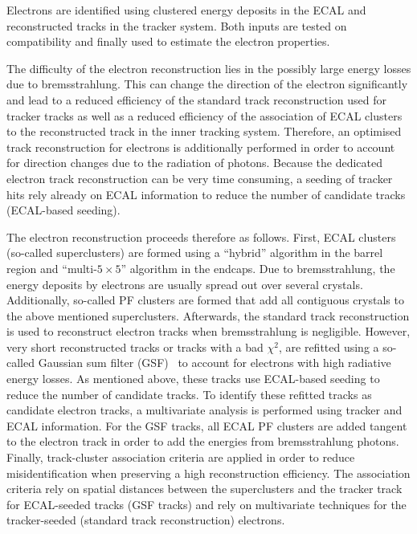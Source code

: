 Electrons are identified using clustered energy deposits in the ECAL and reconstructed tracks in the tracker system. 
Both inputs are tested on compatibility and finally used to estimate the electron properties. 

The difficulty of the electron reconstruction lies in the possibly large energy losses due to bremsstrahlung.
This can change the direction of the electron significantly and lead to a reduced efficiency of the standard track reconstruction used for tracker tracks as well as a reduced efficiency of the association of ECAL clusters to the reconstructed track in the inner tracking system.
Therefore, an optimised track reconstruction for electrons is additionally performed in order to account for direction changes due to the radiation of photons.
Because the dedicated electron track reconstruction can be very time consuming, a seeding of tracker hits rely already on ECAL information to reduce the number of candidate tracks (ECAL-based seeding).

The electron reconstruction proceeds therefore as follows.
First, ECAL clusters (so-called superclusters) are formed using a ``hybrid'' algorithm in the barrel region and ``multi-$5\times 5$'' algorithm in the endcaps.
Due to bremsstrahlung, the energy deposits by electrons are usually spread out over several crystals.
Additionally, so-called PF clusters are formed that add all contiguous crystals to the above mentioned superclusters. 
Afterwards, the standard track reconstruction is used to reconstruct electron tracks when bremsstrahlung is negligible.
However, very short reconstructed tracks or tracks with a bad $\chi^2$, are refitted using a so-called Gaussian sum filter (GSF)~\cite{bib:GSF_2003} to account for electrons with high radiative energy losses.
As mentioned above, these tracks use ECAL-based seeding to reduce the number of candidate tracks.  
To identify these refitted tracks as candidate electron tracks, a multivariate analysis is performed using tracker and ECAL information.
For the GSF tracks, all ECAL PF clusters are added tangent to the electron track in order to add the energies from bremsstrahlung photons.
Finally, track-cluster association criteria are applied in order to reduce misidentification when preserving a high reconstruction efficiency.
The association criteria rely on spatial distances between the superclusters and the tracker track for ECAL-seeded tracks (GSF tracks) and rely on multivariate techniques for the tracker-seeded (standard track reconstruction) electrons.

